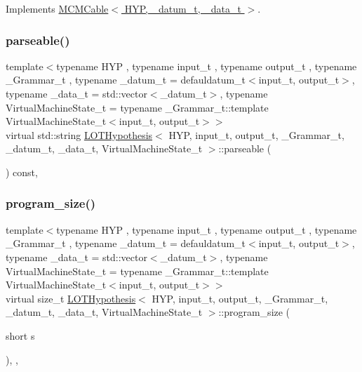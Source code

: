 Implements \hyperlink{class_m_c_m_cable_aa73001ec3bb0cf0c618281dfa998f2f1}{M\+C\+M\+Cable$<$ H\+Y\+P, \+\_\+datum\+\_\+t, \+\_\+data\+\_\+t $>$}.

\mbox{\label{class_l_o_t_hypothesis_a4037b5dea60aeb19d72c16e308886bc2}} 
\subsubsection{\texorpdfstring{parseable()}{parseable()}}
{\footnotesize\ttfamily template$<$typename H\+YP , typename input\+\_\+t , typename output\+\_\+t , typename \+\_\+\+Grammar\+\_\+t , typename \+\_\+datum\+\_\+t  = defauldatum\+\_\+t$<$input\+\_\+t, output\+\_\+t$>$, typename \+\_\+data\+\_\+t  = std\+::vector$<$\+\_\+datum\+\_\+t$>$, typename Virtual\+Machine\+State\+\_\+t  = typename \+\_\+\+Grammar\+\_\+t\+::template Virtual\+Machine\+State\+\_\+t$<$input\+\_\+t, output\+\_\+t$>$$>$ \\
virtual std\+::string \hyperlink{class_l_o_t_hypothesis}{L\+O\+T\+Hypothesis}$<$ H\+YP, input\+\_\+t, output\+\_\+t, \+\_\+\+Grammar\+\_\+t, \+\_\+datum\+\_\+t, \+\_\+data\+\_\+t, Virtual\+Machine\+State\+\_\+t $>$\+::parseable (\begin{DoxyParamCaption}{ }\end{DoxyParamCaption}) const\hspace{0.3cm}{\ttfamily [inline]}, {\ttfamily [virtual]}}

\mbox{\label{class_l_o_t_hypothesis_a9fb7caa245a82c53bcfbac846ab1b327}} 
\subsubsection{\texorpdfstring{program\+\_\+size()}{program\_size()}}
{\footnotesize\ttfamily template$<$typename H\+YP , typename input\+\_\+t , typename output\+\_\+t , typename \+\_\+\+Grammar\+\_\+t , typename \+\_\+datum\+\_\+t  = defauldatum\+\_\+t$<$input\+\_\+t, output\+\_\+t$>$, typename \+\_\+data\+\_\+t  = std\+::vector$<$\+\_\+datum\+\_\+t$>$, typename Virtual\+Machine\+State\+\_\+t  = typename \+\_\+\+Grammar\+\_\+t\+::template Virtual\+Machine\+State\+\_\+t$<$input\+\_\+t, output\+\_\+t$>$$>$ \\
virtual size\+\_\+t \hyperlink{class_l_o_t_hypothesis}{L\+O\+T\+Hypothesis}$<$ H\+YP, input\+\_\+t, output\+\_\+t, \+\_\+\+Grammar\+\_\+t, \+\_\+datum\+\_\+t, \+\_\+data\+\_\+t, Virtual\+Machine\+State\+\_\+t $>$\+::program\+\_\+size (\begin{DoxyParamCaption}\item[{short}]{s }\end{DoxyParamCaption})\hspace{0.3cm}{\ttfamily [inline]}, {\ttfamily [override]}, {\ttfamily [virtual]}}

